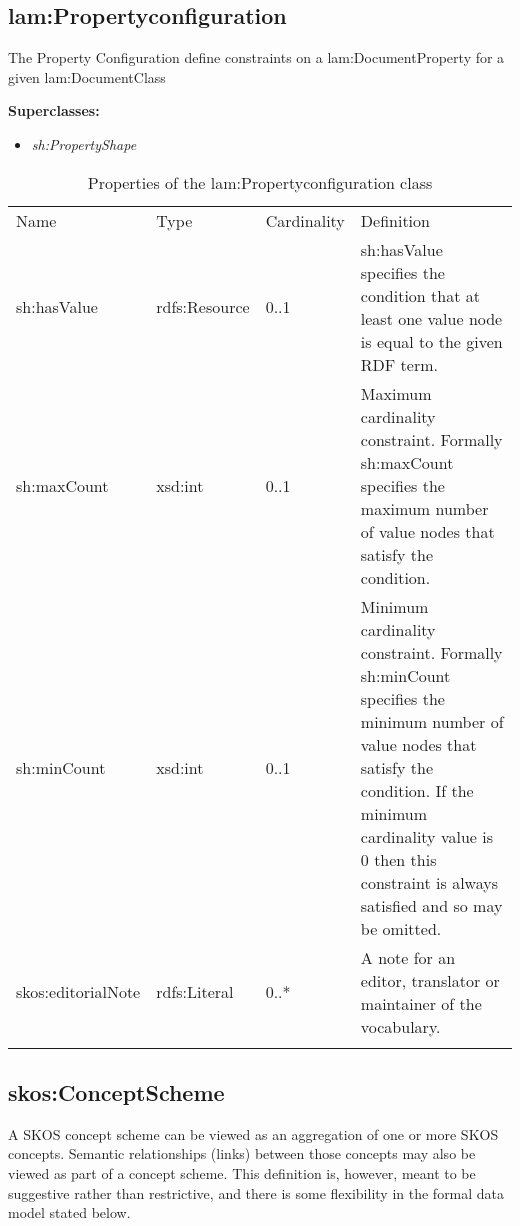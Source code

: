 \subsection{lam:Propertyconfiguration}

The Property Configuration define constraints on a lam:DocumentProperty
for a given lam:DocumentClass

\textbf{Superclasses:}

\begin{itemize}
\itemsep1pt\parskip0pt
\item
  \emph{sh:PropertyShape}
\end{itemize}

{
	\footnotesize
	\selectfont%
	\begin{longtable}[c]{@{}p{3cm}p{2cm}p{2cm}p{7.8cm}@{}}
		\toprule\addlinespace
		Name & Type & Cardinality & Definition
		\\\addlinespace
		\midrule\endhead
		sh:hasValue & rdfs:Resource & 0..1 & sh:hasValue specifies the condition
		that at least one value node is equal to the given RDF term.
		\\\addlinespace
		sh:maxCount & xsd:int & 0..1 & Maximum cardinality constraint. Formally
		sh:maxCount specifies the maximum number of value nodes that satisfy the
		condition.
		\\\addlinespace
		sh:minCount & xsd:int & 0..1 & Minimum cardinality constraint. Formally
		sh:minCount specifies the minimum number of value nodes that satisfy the
		condition. If the minimum cardinality value is 0 then this constraint is
		always satisfied and so may be omitted.
		\\\addlinespace
		skos:editorialNote & rdfs:Literal & 0..* & A note for an editor,
		translator or maintainer of the vocabulary.
		\\\addlinespace
		\bottomrule
		\addlinespace
		\caption{Properties of the lam:Propertyconfiguration class}
	\end{longtable}
}

\subsection{skos:ConceptScheme}

A SKOS concept scheme can be viewed as an aggregation of one or more
SKOS concepts. Semantic relationships (links) between those concepts may
also be viewed as part of a concept scheme. This definition is, however,
meant to be suggestive rather than restrictive, and there is some
flexibility in the formal data model stated below.

